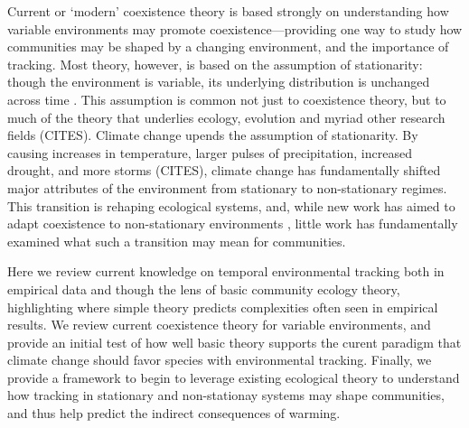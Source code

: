 \documentclass[11pt,letterpaper]{article}
\begin{document}
Current or `modern' coexistence theory is based strongly on understanding how variable environments may promote coexistence---providing one way to study how communities may be shaped by a changing environment, and the importance of tracking. Most theory, however, is based on the assumption of stationarity: though the environment is variable, its underlying distribution is unchanged across time \citep{barabas2018}. This assumption is common not just to coexistence theory, but to much of the theory that underlies ecology, evolution and myriad other research fields (CITES). Climate change upends the assumption of stationarity. By causing increases in temperature, larger pulses of precipitation, increased drought, and more storms (CITES), climate change has fundamentally shifted major attributes of the environment from stationary to non-stationary regimes. This transition is rehaping ecological systems, and, while new work has aimed to adapt coexistence to non-stationary environments \citep{chessonnonstat}, little work has fundamentally examined what such a transition may mean for communities.  %

Here we review current knowledge on temporal environmental tracking both in empirical data and though the lens of basic community ecology theory, highlighting where simple theory predicts complexities often seen in empirical results. We review current coexistence theory for variable environments, and provide an initial test of how well basic theory supports the curent paradigm that climate change should favor species with environmental tracking. Finally, we provide a framework to begin to leverage existing ecological theory to understand how tracking in stationary and non-stationay systems may shape communities, and thus help predict the indirect consequences of warming. %
\end{document}
